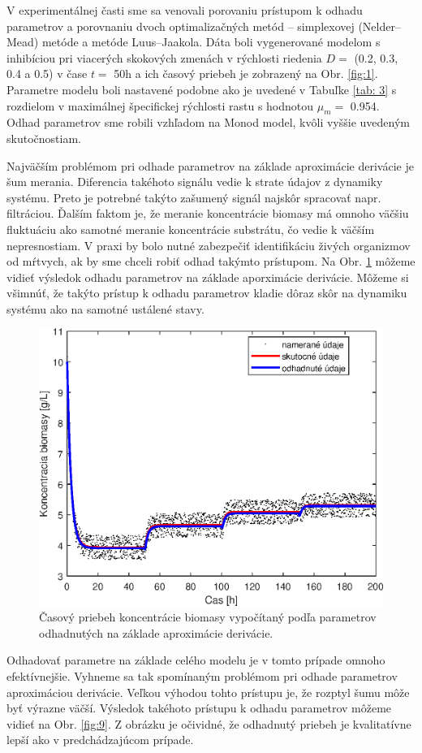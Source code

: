 V experimentálnej časti sme sa venovali porovaniu prístupom k odhadu parametrov a porovnaniu dvoch optimalizačných metód -- simplexovej (Nelder--Mead) metóde a metóde Luus--Jaakola. Dáta boli vygenerované modelom s inhibíciou pri viacerých skokových zmenách v rýchlosti riedenia $D = $ (0.2, 0.3, 0.4 a 0.5) v čase $t = $ 50\unit{\hour} a ich časový priebeh je zobrazený na Obr. \ref{fig:1}. Parametre modelu boli nastavené podobne ako je uvedené v Tabuľke \ref{tab: 3} s rozdielom v maximálnej špecifickej rýchlosti rastu s hodnotou $\mu_{m} = $ 0.954. Odhad parametrov sme robili vzhľadom na Monod model, kvôli vyššie uvedeným skutočnostiam. 

Najväčším problémom pri odhade parametrov na základe aproximácie derivácie je šum merania. Diferencia takéhoto signálu vedie k strate údajov z dynamiky systému. Preto je potrebné takýto zašumený signál najskôr spracovať napr. filtráciou. Ďalším faktom je, že meranie koncentrácie biomasy má omnoho väčšiu fluktuáciu ako samotné meranie koncentrácie substrátu, čo vedie k väčším nepresnostiam. V praxi by bolo nutné zabezpečiť identifikáciu živých organizmov od mŕtvych, ak by sme chceli robiť odhad takýmto prístupom. Na Obr. \ref{fig:8} môžeme vidieť výsledok odhadu parametrov na základe aporximácie derivácie. Môžeme si všimnúť, že takýto prístup k odhadu parametrov kladie dôraz skôr na dynamiku systému ako na samotné ustálené stavy.

\begin{figure}
	\centering
	\includegraphics[width=.7\linewidth]{images/der_approximation}
	\caption[]{Časový priebeh koncentrácie biomasy vypočítaný podľa parametrov odhadnutých na základe aproximácie derivácie.}
	\label{fig:8}
\end{figure}

Odhadovať parametre na základe celého modelu je v tomto prípade omnoho efektívnejšie. Vyhneme sa tak spomínaným problémom pri odhade parametrov aproximáciou derivácie. Veľkou výhodou tohto prístupu je, že rozptyl šumu môže byť výrazne väčší. Výsledok takéhoto prístupu k odhadu parametrov môžeme vidieť na Obr. \ref{fig:9}. Z obrázku je očividné, že odhadnutý priebeh je kvalitatívne lepší ako v predchádzajúcom prípade.

